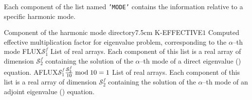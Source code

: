 Each component of the list named {\tt 'MODE'} contains the information relative to a specific
harmonic mode.

\begin{DescriptionEnregistrement}{Component of the harmonic mode directory}{7.5cm}
\RealEnr
  {K-EFFECTIVE}{$1$}{}
  {Computed effective multiplication factor for eigenvalue problem,
  corresponding to the $\alpha$--th mode}
\DirlEnr
  {FLUX}{$\mathcal{S}^{f}_{1}$}
  {List of real arrays. Each component of this list is a real array of dimension $\mathcal{S}^{f}_{2}$
  containing the solution of the $\alpha$--th mode of a direct eigenvalue () equation.}
\OptDirlEnr
  {AFLUX}{$\mathcal{S}^{f}_{1}$}{${\mathcal{S}^{f}_{3}\over 10} \bmod 10 = 1$}
  {List of real arrays. Each component of this list is a real array of dimension $\mathcal{S}^{f}_{2}$
  containing the solution of the $\alpha$--th mode of an adjoint eigenvalue () equation.}
\end{DescriptionEnregistrement}

\eject
